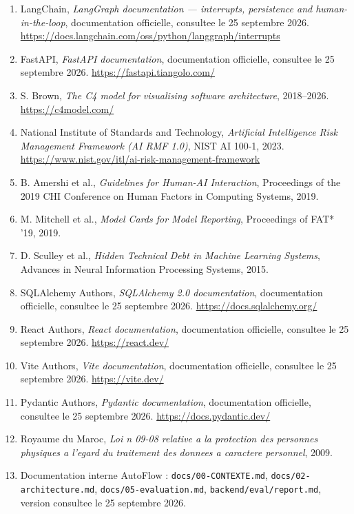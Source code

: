 \documentclass[12pt,a4paper,openany]{report}
\begin{document}
\begin{enumerate}[leftmargin=1.6em, itemsep=3pt]
\item LangChain, \emph{LangGraph documentation --- interrupts, persistence and human-in-the-loop}, documentation officielle, consultee le 25 septembre 2026. \url{https://docs.langchain.com/oss/python/langgraph/interrupts}
\item FastAPI, \emph{FastAPI documentation}, documentation officielle, consultee le 25 septembre 2026. \url{https://fastapi.tiangolo.com/}
\item S. Brown, \emph{The C4 model for visualising software architecture}, 2018--2026. \url{https://c4model.com/}
\item National Institute of Standards and Technology, \emph{Artificial Intelligence Risk Management Framework (AI RMF 1.0)}, NIST AI 100-1, 2023. \url{https://www.nist.gov/itl/ai-risk-management-framework}
\item B. Amershi et al., \emph{Guidelines for Human-AI Interaction}, Proceedings of the 2019 CHI Conference on Human Factors in Computing Systems, 2019.
\item M. Mitchell et al., \emph{Model Cards for Model Reporting}, Proceedings of FAT* '19, 2019.
\item D. Sculley et al., \emph{Hidden Technical Debt in Machine Learning Systems}, Advances in Neural Information Processing Systems, 2015.
\item SQLAlchemy Authors, \emph{SQLAlchemy 2.0 documentation}, documentation officielle, consultee le 25 septembre 2026. \url{https://docs.sqlalchemy.org/}
\item React Authors, \emph{React documentation}, documentation officielle, consultee le 25 septembre 2026. \url{https://react.dev/}
\item Vite Authors, \emph{Vite documentation}, documentation officielle, consultee le 25 septembre 2026. \url{https://vite.dev/}
\item Pydantic Authors, \emph{Pydantic documentation}, documentation officielle, consultee le 25 septembre 2026. \url{https://docs.pydantic.dev/}
\item Royaume du Maroc, \emph{Loi n\textdegree{} 09-08 relative a la protection des personnes physiques a l'egard du traitement des donnees a caractere personnel}, 2009.
\item Documentation interne AutoFlow : \texttt{docs/00-CONTEXTE.md}, \texttt{docs/02-architecture.md}, \texttt{docs/05-evaluation.md}, \texttt{backend/eval/report.md}, version consultee le 25 septembre 2026.
\end{enumerate}
\end{document}
